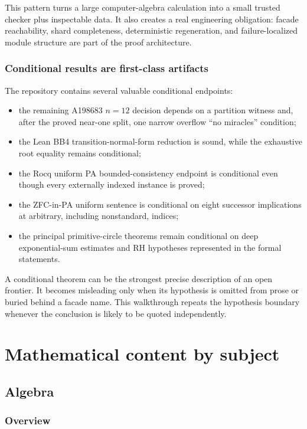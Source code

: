 \documentclass[
  10pt,
  a4paper,
  twoside,
  open=any,
  parskip=half,
  headings=big
]{scrreprt}
\begin{document}
This pattern turns a large computer-algebra calculation into a small trusted checker plus inspectable data. It also creates a real engineering obligation: facade reachability, shard completeness, deterministic regeneration, and failure-localized module structure are part of the proof architecture.

\section{Conditional results are first-class artifacts}

The repository contains several valuable conditional endpoints:

\begin{itemize}
  \item the remaining A198683 \(n=12\) decision depends on a partition witness and, after the proved near-one split, one narrow overflow ``no miracles'' condition;
  \item the Lean BB4 transition-normal-form reduction is sound, while the exhaustive root equality remains conditional;
  \item the Rocq uniform PA bounded-consistency endpoint is conditional even though every externally indexed instance is proved;
  \item the ZFC-in-PA uniform sentence is conditional on eight successor implications at arbitrary, including nonstandard, indices;
  \item the principal primitive-circle theorems remain conditional on deep exponential-sum estimates and RH hypotheses represented in the formal statements.
\end{itemize}

A conditional theorem can be the strongest precise description of an open frontier. It becomes misleading only when its hypothesis is omitted from prose or buried behind a facade name. This walkthrough repeats the hypothesis boundary whenever the conclusion is likely to be quoted independently.


\part{Mathematical content by subject}

\chapter{Algebra}
\label{ch:algebra}

\section{Overview}
\end{document}
